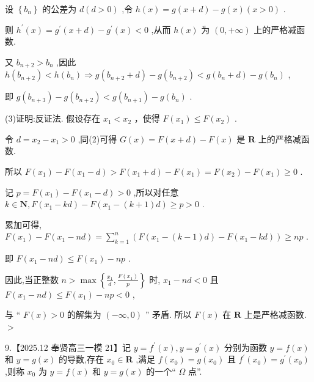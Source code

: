 \documentclass[10pt]{article}
\begin{document}
设 \(\left\{  {b}_{n}\right\}\) 的公差为 \(d\left( {d > 0}\right)\) ,令 \(h\left( x\right)  = g\left( {x + d}\right)  - g\left( x\right) \left( {x > 0}\right)\) .

则 \({h}^{\prime }\left( x\right)  = {g}^{\prime }\left( {x + d}\right)  - {g}^{\prime }\left( x\right)  < 0\) ,从而 \(h\left( x\right)\) 为 \(\left( {0, + \infty }\right)\) 上的严格减函数.

又 \({b}_{n + 2} > {b}_{n}\) ,因此 \(h\left( {b}_{n + 2}\right)  < h\left( {b}_{n}\right)  \Rightarrow  g\left( {{b}_{n + 2} + d}\right)  - g\left( {b}_{n + 2}\right)  < g\left( {{b}_{n} + d}\right)  - g\left( {b}_{n}\right)\) ,

即 \(g\left( {b}_{n + 3}\right)  - g\left( {b}_{n + 2}\right)  < g\left( {b}_{n + 1}\right)  - g\left( {b}_{n}\right)\) .

(3)证明:反证法. 假设存在 \({x}_{1} < {x}_{2}\) ，使得 \(F\left( {x}_{1}\right)  \leq  F\left( {x}_{2}\right)\) .

令 \(d = {x}_{2} - {x}_{1} > 0\) ,同(2)可得 \(G\left( x\right)  = F\left( {x + d}\right)  - F\left( x\right)\) 是 \(\mathbf{R}\) 上的严格减函数.

所以 \(F\left( {x}_{1}\right)  - F\left( {{x}_{1} - d}\right)  > F\left( {{x}_{1} + d}\right)  - F\left( {x}_{1}\right)  = F\left( {x}_{2}\right)  - F\left( {x}_{1}\right)  \geq  0\) .

记 \(p = F\left( {x}_{1}\right)  - F\left( {{x}_{1} - d}\right)  > 0\) ,所以对任意 \(k \in  \mathbf{N},F\left( {{x}_{1} - {kd}}\right)  - F\left( {{x}_{1} - \left( {k + 1}\right) d}\right)  \geq  p > 0\) .

累加可得, \(F\left( {x}_{1}\right)  - F\left( {{x}_{1} - {nd}}\right)  = \mathop{\sum }\limits_{{k = 1}}^{n}\left( {F\left( {{x}_{1} - \left( {k - 1}\right) d}\right)  - F\left( {{x}_{1} - {kd}}\right) }\right)  \geq  {np}\) .

即 \(F\left( {{x}_{1} - {nd}}\right)  \leq  F\left( {x}_{1}\right)  - {np}\) .

因此,当正整数 \(n > \max \left\{  {\frac{{x}_{1}}{d},\frac{F\left( {x}_{1}\right) }{p}}\right\}\) 时, \({x}_{1} - {nd} < 0\) 且 \(F\left( {{x}_{1} - {nd}}\right)  \leq  F\left( {x}_{1}\right)  - {np} < 0\) ,

与 “ \(F\left( x\right)  > 0\) 的解集为 \(\left( {-\infty ,0}\right)\) ” 矛盾. 所以 \(F\left( x\right)\) 在 \(\mathbf{R}\) 上是严格减函数. \(>\)

9.【2025.12 奉贤高三一模 21】记 \(y = {f}^{\prime }\left( x\right) ,y = {g}^{\prime }\left( x\right)\) 分别为函数 \(y = f\left( x\right)\) 和 \(y = g\left( x\right)\) 的导数,存在 \({x}_{0} \in  \mathbf{R}\) ,满足 \(f\left( {x}_{0}\right)  = g\left( {x}_{0}\right)\) 且 \({f}^{\prime }\left( {x}_{0}\right)  = {g}^{\prime }\left( {x}_{0}\right)\) ,则称 \({x}_{0}\) 为 \(y = f\left( x\right)\) 和 \(y = g\left( x\right)\) 的一个“ \(\Omega\) 点”.
\end{document}
